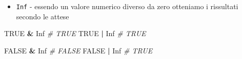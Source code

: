 \documentclass[
]{book}
\newenvironment{Shaded}{\begin{snugshade}}{\end{snugshade}}
\newcommand{\CommentTok}[1]{\textcolor[rgb]{0.56,0.35,0.01}{\textit{#1}}}
\newcommand{\OperatorTok}[1]{\textcolor[rgb]{0.81,0.36,0.00}{\textbf{#1}}}
\newcommand{\OtherTok}[1]{\textcolor[rgb]{0.56,0.35,0.01}{#1}}
\newcommand{\StringTok}[1]{\textcolor[rgb]{0.31,0.60,0.02}{#1}}
\providecommand{\tightlist}{%
  \setlength{\itemsep}{0pt}\setlength{\parskip}{0pt}}
\begin{document}
\begin{itemize}
\tightlist
\item
  \texttt{Inf} - essendo un valore numerico diverso da zero otteniamo i rissultati secondo le attese
\end{itemize}

\begin{Shaded}
\begin{Highlighting}[]
\OtherTok{TRUE} \OperatorTok{&}\StringTok{ }\OtherTok{Inf}  \CommentTok{# TRUE}
\OtherTok{TRUE} \OperatorTok{|}\StringTok{ }\OtherTok{Inf}  \CommentTok{# TRUE}

\OtherTok{FALSE} \OperatorTok{&}\StringTok{ }\OtherTok{Inf} \CommentTok{# FALSE}
\OtherTok{FALSE} \OperatorTok{|}\StringTok{ }\OtherTok{Inf} \CommentTok{# TRUE}
\end{Highlighting}
\end{Shaded}
\end{document}
